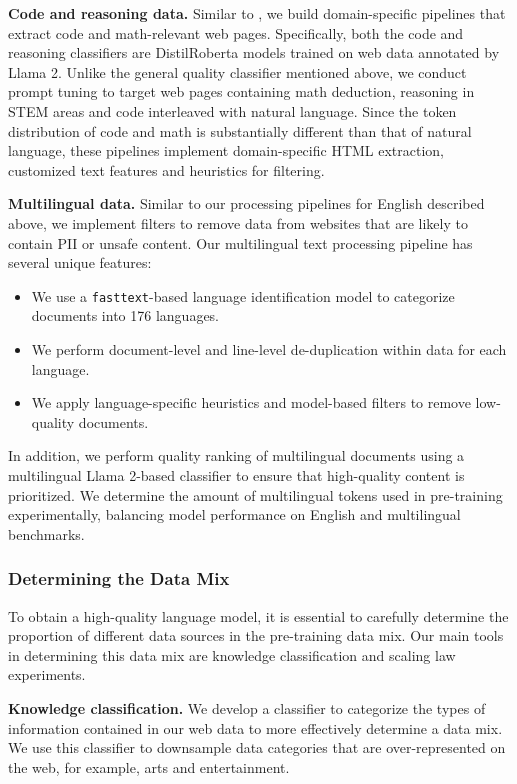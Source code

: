 \textbf{Code and reasoning data.} Similar to \citet{deepseekai2024deepseekcoderv2breakingbarrierclosedsource}, we build domain-specific pipelines that extract code and math-relevant web pages. Specifically, both the code and reasoning classifiers are DistilRoberta models trained on web data annotated by Llama 2. Unlike the general quality classifier mentioned above, we conduct prompt tuning to target web pages containing math deduction, reasoning in STEM areas and code interleaved with natural language. Since the token distribution of code and math is substantially different than that of natural language, these pipelines implement domain-specific HTML extraction, customized text features and heuristics for filtering.

\textbf{Multilingual data.} Similar to our processing pipelines for English described above, we implement filters to remove data from websites that are likely to contain PII or unsafe content. Our multilingual text processing pipeline has several unique features:

\begin{itemize}
\item We use a \texttt{fasttext}-based language identification model to categorize documents into 176 languages.
\item We perform document-level and line-level de-duplication within data for each language.
\item We apply language-specific heuristics and model-based filters to remove low-quality documents.
\end{itemize}

In addition, we perform quality ranking of multilingual documents using a multilingual Llama 2-based classifier to ensure that high-quality content is prioritized. We determine the amount of multilingual tokens used in pre-training experimentally, balancing model performance on  English and multilingual benchmarks.

\subsubsection{Determining the Data Mix} To obtain a high-quality language model, it is essential to carefully determine the proportion of different data sources in the pre-training data mix. Our main tools in determining this data mix are knowledge classification and scaling law experiments.

\textbf{Knowledge classification.} We develop a classifier to categorize the types of information contained in our web data to more effectively determine a data mix. We use this classifier to downsample data categories that are over-represented on the web, for example, arts and entertainment.


